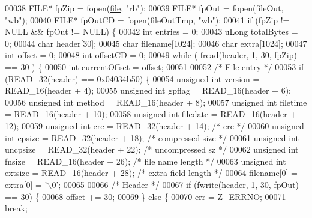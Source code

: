 \begin{DoxyCode}
00038   FILE* fpZip = fopen(\hyperlink{structfile}{file}, \textcolor{stringliteral}{"rb"});
00039   FILE* fpOut = fopen(fileOut, \textcolor{stringliteral}{"wb"});
00040   FILE* fpOutCD = fopen(fileOutTmp, \textcolor{stringliteral}{"wb"});
00041   \textcolor{keywordflow}{if} (fpZip != NULL &&  fpOut != NULL) \{
00042     \textcolor{keywordtype}{int} entries = 0;
00043     uLong totalBytes = 0;
00044     \textcolor{keywordtype}{char} header[30];
00045     \textcolor{keywordtype}{char} filename[1024];
00046     \textcolor{keywordtype}{char} extra[1024];
00047     \textcolor{keywordtype}{int} offset = 0;
00048     \textcolor{keywordtype}{int} offsetCD = 0;
00049     \textcolor{keywordflow}{while} ( fread(header, 1, 30, fpZip) == 30 ) \{
00050       \textcolor{keywordtype}{int} currentOffset = offset;
00051 
00052       \textcolor{comment}{/* File entry */}
00053       \textcolor{keywordflow}{if} (READ\_32(header) == 0x04034b50) \{
00054         \textcolor{keywordtype}{unsigned} \textcolor{keywordtype}{int} version = READ\_16(header + 4);
00055         \textcolor{keywordtype}{unsigned} \textcolor{keywordtype}{int} gpflag = READ\_16(header + 6);
00056         \textcolor{keywordtype}{unsigned} \textcolor{keywordtype}{int} method = READ\_16(header + 8);
00057         \textcolor{keywordtype}{unsigned} \textcolor{keywordtype}{int} filetime = READ\_16(header + 10);
00058         \textcolor{keywordtype}{unsigned} \textcolor{keywordtype}{int} filedate = READ\_16(header + 12);
00059         \textcolor{keywordtype}{unsigned} \textcolor{keywordtype}{int} crc = READ\_32(header + 14); \textcolor{comment}{/* crc */}
00060         \textcolor{keywordtype}{unsigned} \textcolor{keywordtype}{int} cpsize = READ\_32(header + 18); \textcolor{comment}{/* compressed size */}
00061         \textcolor{keywordtype}{unsigned} \textcolor{keywordtype}{int} uncpsize = READ\_32(header + 22); \textcolor{comment}{/* uncompressed sz */}
00062         \textcolor{keywordtype}{unsigned} \textcolor{keywordtype}{int} fnsize = READ\_16(header + 26); \textcolor{comment}{/* file name length */}
00063         \textcolor{keywordtype}{unsigned} \textcolor{keywordtype}{int} extsize = READ\_16(header + 28); \textcolor{comment}{/* extra field length */}
00064         filename[0] = extra[0] = \textcolor{charliteral}{'\(\backslash\)0'};
00065 
00066         \textcolor{comment}{/* Header */}
00067         \textcolor{keywordflow}{if} (fwrite(header, 1, 30, fpOut) == 30) \{
00068           offset += 30;
00069         \} \textcolor{keywordflow}{else} \{
00070           err = Z\_ERRNO;
00071           \textcolor{keywordflow}{break};

\end{DoxyCode}
